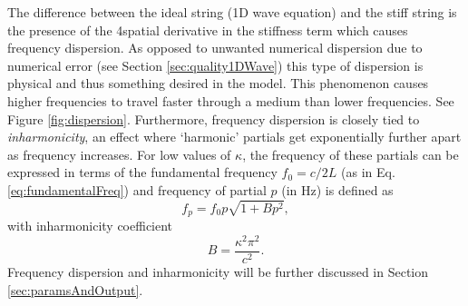 The difference between the ideal string (1D wave equation) and the stiff string is the presence of the 4\thOrder spatial derivative in the stiffness term which causes frequency dispersion. As opposed to unwanted numerical dispersion due to numerical error (see Section \ref{sec:quality1DWave}) this type of dispersion is physical and thus something desired in the model. This phenomenon causes higher frequencies to travel faster through a medium than lower frequencies. See Figure \ref{fig:dispersion}. Furthermore, frequency dispersion is closely tied to \textit{inharmonicity}, an effect where `harmonic' partials get exponentially further apart as frequency increases. For low values of $\kappa$, the frequency of these partials can be expressed in terms of the fundamental frequency $f_0 = c/2L$ (as in Eq. \eqref{eq:fundamentalFreq}) and frequency of partial $p$ (in Hz) is defined as
\begin{equation}\label{eq:inharmonicityEquation}
    f_p = f_0 p \sqrt{1 + B p^2},
\end{equation}
with inharmonicity coefficient 
\begin{equation*}
    B = \frac{\kappa^2 \pi^2}{c^2}.
\end{equation*}
Frequency dispersion and inharmonicity will be further discussed in Section \ref{sec:paramsAndOutput}.

